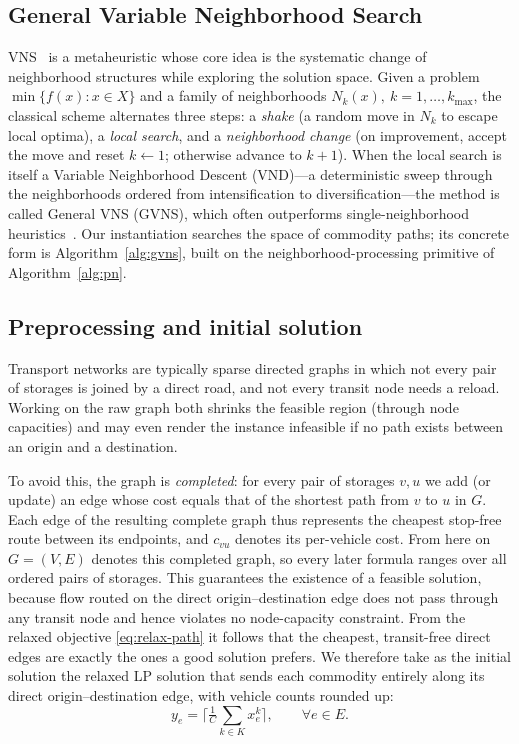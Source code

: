 \documentclass[runningheads]{llncs}
\newcommand{\E}{E}
\newcommand{\Vv}{V}
\begin{document}
\subsection{General Variable Neighborhood Search}
VNS~\cite{hansen2019,hansen2017} is a metaheuristic whose core idea is the
systematic change of neighborhood structures while exploring the solution space.
Given a problem $\min\{f(x):x\in X\}$ and a family of neighborhoods
$N_k(x),\ k=1,\dots,k_{\max}$, the classical scheme alternates three steps: a
\emph{shake} (a random move in $N_k$ to escape local optima), a \emph{local
search}, and a \emph{neighborhood change} (on improvement, accept the move and
reset $k\!\gets\!1$; otherwise advance to $k\!+\!1$). When the local search is
itself a Variable Neighborhood Descent (VND)---a deterministic sweep through the
neighborhoods ordered from intensification to diversification---the method is
called General VNS (GVNS), which often outperforms single-neighborhood
heuristics~\cite{karakostas2019,mjirda2014}. Our instantiation searches the space
of commodity paths; its concrete form is Algorithm~\ref{alg:gvns}, built on the
neighborhood-processing primitive of Algorithm~\ref{alg:pn}.

\subsection{Preprocessing and initial solution}
Transport networks are typically sparse directed graphs in which not every
pair of storages is joined by a direct road, and not every transit node needs
a reload. Working on the raw graph both shrinks the feasible region (through
node capacities) and may even render the instance infeasible if no path exists
between an origin and a destination.

To avoid this, the graph is \emph{completed}: for every pair of storages
$v,u$ we add (or update) an edge whose cost equals that of the shortest path
from $v$ to $u$ in $G$. Each edge of the resulting complete graph thus
represents the cheapest stop-free route between its endpoints, and $c_{vu}$
denotes its per-vehicle cost. From here on $G=(\Vv,\E)$ denotes this completed
graph, so every later formula ranges over all ordered pairs of storages. This guarantees
the existence of a feasible solution, because flow routed on the direct
origin--destination edge does not pass through any transit node and hence
violates no node-capacity constraint. From the relaxed objective
\eqref{eq:relax-path} it follows that the cheapest, transit-free direct edges
are exactly the ones a good solution prefers. We therefore take as the initial
solution the relaxed LP solution that sends each commodity entirely along its
direct origin--destination edge, with vehicle counts rounded up:
\begin{equation}
y_e=\Big\lceil \tfrac1C\sum_{k\in K} x^k_e\Big\rceil, \qquad \forall e\in \E.
\label{eq:init}
\end{equation}
\end{document}
